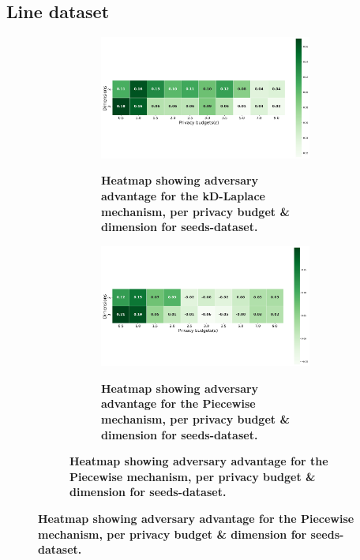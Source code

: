 {\newpage
\subsection{Line dataset}
\begin{figure}[H]
  \centering
  \begin{subfigure}[b]{0.85\textwidth}
    \begin{subfigure}[c]{1\textwidth}
      \caption{\textbf{Heatmap showing adversary advantage for the kD-Laplace mechanism, per privacy budget \& dimension for seeds-dataset.}}
      \includegraphics[width=1\textwidth]{Results/nd-laplace/nd-Laplace/line-dataset/shokri_mi_adv.png}
      \label{fig:privacy_line-dataset_adversial_advantage_kd-laplace}
    \end{subfigure}
    \vfill %

    \begin{subfigure}[c]{1\textwidth}
      \caption{\textbf{Heatmap showing adversary advantage for the Piecewise mechanism, per privacy budget \& dimension for seeds-dataset.}}
      \includegraphics[width=1\textwidth]{Results/nd-laplace/piecewise/line-dataset/shokri_mi_adv.png}
      \label{fig:privacy_line-dataset_adversial_advantage_piecewise}
    \end{subfigure}
  \end{subfigure}
\end{figure}
\newpage
}
